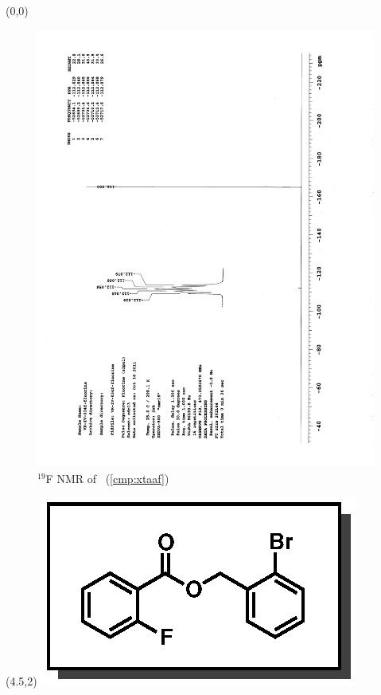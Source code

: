 \clearpage
\begin{textblock}{20}(0,0)
\begin{figure}[htb]
\caption{$^{19}$F NMR of  \CMPxtaaf\ (\ref{cmp:xtaaf})}
\includegraphics[scale=0.75, trim = 0mm 0mm 0mm 5mm,
clip]{chp_asymmetric/images/nmr/xtaafF}
\vspace{-100pt}
\end{figure}
\end{textblock}
\begin{textblock}{1}(4.5,2)
\includegraphics[scale=0.8, angle=90]{chp_asymmetric/images/xtaaf}
\end{textblock}
\clearpage

